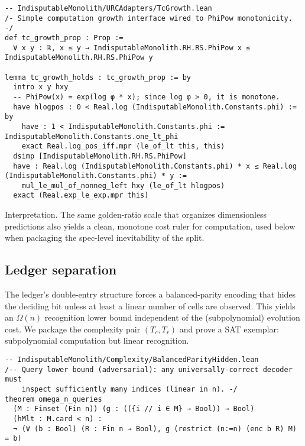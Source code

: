 \documentclass[11pt,a4paper,twoside]{article}
\numberwithin{equation}{section}
\theoremstyle{customthm}
\theoremstyle{customdef}
\theoremstyle{customrem}
\begin{document}
\begin{lstlisting}
-- IndisputableMonolith/URCAdapters/TcGrowth.lean
/- Simple computation growth interface wired to PhiPow monotonicity. -/
def tc_growth_prop : Prop :=
  ∀ x y : ℝ, x ≤ y → IndisputableMonolith.RH.RS.PhiPow x ≤ IndisputableMonolith.RH.RS.PhiPow y

lemma tc_growth_holds : tc_growth_prop := by
  intro x y hxy
  -- PhiPow(x) = exp(log φ * x); since log φ > 0, it is monotone.
  have hlogpos : 0 < Real.log (IndisputableMonolith.Constants.phi) := by
    have : 1 < IndisputableMonolith.Constants.phi := IndisputableMonolith.Constants.one_lt_phi
    exact Real.log_pos_iff.mpr ⟨le_of_lt this, this⟩
  dsimp [IndisputableMonolith.RH.RS.PhiPow]
  have : Real.log (IndisputableMonolith.Constants.phi) * x ≤ Real.log (IndisputableMonolith.Constants.phi) * y :=
    mul_le_mul_of_nonneg_left hxy (le_of_lt hlogpos)
  exact (Real.exp_le_exp.mpr this)
\end{lstlisting}

Interpretation. The same golden-ratio scale that organizes dimensionless predictions also yields a clean, monotone cost ruler for computation, used below when packaging the spec-level inevitability of the split.

\subsection{Ledger separation}\label{subsec:pn-ledger}

The ledger's double-entry structure forces a balanced-parity encoding that hides the deciding bit unless at least a linear number of cells are observed. This yields an \(\Omega(n)\) recognition lower bound independent of the (subpolynomial) evolution cost. We package the complexity pair \((T_c, T_r)\) and prove a SAT exemplar: subpolynomial computation but linear recognition.

\begin{lstlisting}
-- IndisputableMonolith/Complexity/BalancedParityHidden.lean
/-- Query lower bound (adversarial): any universally-correct decoder must
    inspect sufficiently many indices (linear in n). -/
theorem omega_n_queries
  (M : Finset (Fin n)) (g : (({i // i ∈ M} → Bool)) → Bool)
  (hMlt : M.card < n) :
  ¬ (∀ (b : Bool) (R : Fin n → Bool), g (restrict (n:=n) (enc b R) M) = b)
\end{lstlisting}
\end{document}
